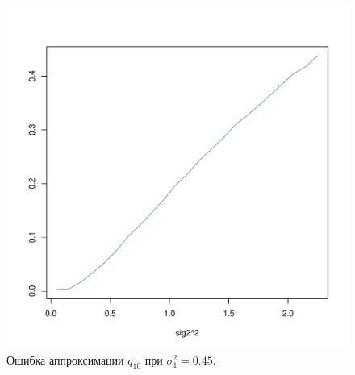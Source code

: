 \documentclass[12pt]{article}
\begin{document}
\begin{figure}[!hhh]
	\begin{center}
		\begin{minipage}[h]{0.8\linewidth}
			\includegraphics[width=1\linewidth]{img/gr_new_2.pdf}
			\caption{Ошибка аппроксимации $q_{10}$ при $\sigma_{1}^{2} = 0.45$.} %
			\label{ris8} %
		\end{minipage}	
	\end{center}
\end{figure}
\end{document}
